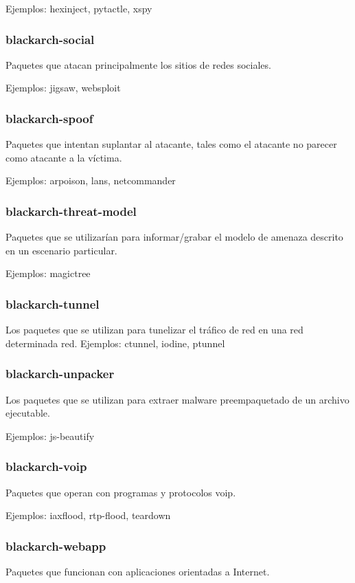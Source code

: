 \documentclass[a4paper, oneside, 11pt]{book}
\begin{document}
Ejemplos: hexinject, pytactle, xspy

\subsubsection{blackarch-social}
Paquetes que atacan principalmente los sitios de redes sociales.

Ejemplos: jigsaw, websploit

\subsubsection{blackarch-spoof}
Paquetes que intentan suplantar al atacante, tales como
el atacante no parecer como atacante a la v\'ictima.

Ejemplos: arpoison, lans, netcommander

\subsubsection{blackarch-threat-model}
Paquetes que se utilizar\'ian para informar/grabar el
modelo de amenaza descrito en un escenario particular.

Ejemplos: magictree

\subsubsection{blackarch-tunnel}
Los paquetes que se utilizan para tunelizar el tr\'afico de red en una red determinada
red.
Ejemplos: ctunnel, iodine, ptunnel

\subsubsection{blackarch-unpacker}
Los paquetes que se utilizan para extraer malware preempaquetado de un archivo
ejecutable.

Ejemplos: js-beautify

\subsubsection{blackarch-voip}
Paquetes que operan con programas y protocolos voip.

Ejemplos: iaxflood, rtp-flood, teardown

\subsubsection{blackarch-webapp}
Paquetes que funcionan con aplicaciones orientadas a Internet.
\end{document}
